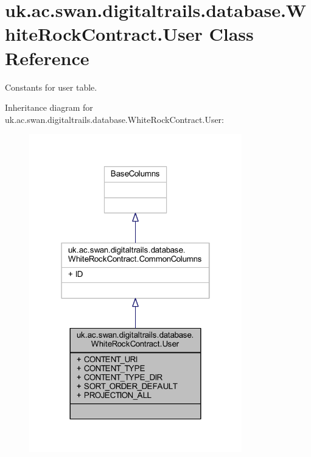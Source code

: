 \hypertarget{classuk_1_1ac_1_1swan_1_1digitaltrails_1_1database_1_1_white_rock_contract_1_1_user}{\section{uk.\+ac.\+swan.\+digitaltrails.\+database.\+White\+Rock\+Contract.\+User Class Reference}
\label{classuk_1_1ac_1_1swan_1_1digitaltrails_1_1database_1_1_white_rock_contract_1_1_user}
}


Constants for user table.  




Inheritance diagram for uk.\+ac.\+swan.\+digitaltrails.\+database.\+White\+Rock\+Contract.\+User\+:
\nopagebreak
\begin{figure}[H]
\begin{center}
\leavevmode
\includegraphics[width=262pt]{classuk_1_1ac_1_1swan_1_1digitaltrails_1_1database_1_1_white_rock_contract_1_1_user__inherit__graph}
\end{center}
\end{figure}


